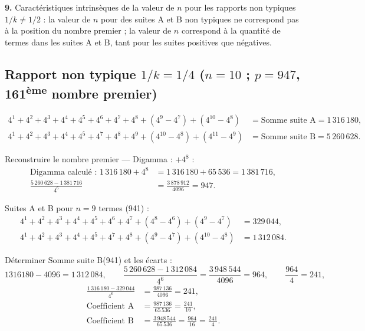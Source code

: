\documentclass[11pt,a4paper]{article}
\begin{document}
\textbf{9.} Caractéristiques intrinsèques de la valeur de $n$ pour les rapports
non typiques $1/k \neq 1/2$ : la valeur de $n$ pour des suites A et B non
typiques ne correspond pas à la position du nombre premier ; la valeur de $n$
correspond à la quantité de termes dans les suites A et B, tant pour les suites
positives que négatives.

\subsection{Rapport non typique $1/k = 1/4$ ($n = 10$ ; $p = 947$, 161\textsuperscript{ème} nombre premier)}

\begin{boiteformule}[Sommes des suites A et B --- rapport $1/4$, $n = 10$]
\begin{align*}
4^{1}+4^{2}+4^{3}+4^{4}+4^{5}+4^{6}+4^{7}+4^{8}+(4^{9}-4^{7})+(4^{10}-4^{8})
  &= \text{Somme suite A} = 1\,316\,180,\\
4^{1}+4^{2}+4^{3}+4^{4}+4^{5}+4^{7}+4^{8}+4^{9}+(4^{10}-4^{8})+(4^{11}-4^{9})
  &= \text{Somme suite B} = 5\,260\,628.
\end{align*}
\end{boiteformule}

Reconstruire le nombre premier --- Digamma : $+4^{8}$ :
\begin{align*}
\text{Digamma calculé : }1\,316\,180+4^{8}
&=1\,316\,180+65\,536=1\,381\,716,\\
\frac{5\,260\,628-1\,381\,716}{4^{6}}
&=\frac{3\,878\,912}{4096}=947.
\end{align*}

Suites A et B pour $n = 9$ termes (941) :
\begin{align*}
4^{1}+4^{2}+4^{3}+4^{4}+4^{5}+4^{6}+4^{7}+(4^{8}-4^{6})+(4^{9}-4^{7}) &= 329\,044,\\
4^{1}+4^{2}+4^{3}+4^{4}+4^{5}+4^{7}+4^{8}+(4^{9}-4^{7})+(4^{10}-4^{8}) &= 1\,312\,084.
\end{align*}

Déterminer Somme suite B(941) et les écarts :
\[
1316180 - 4096 = 1\,312\,084,
\qquad
\frac{5\,260\,628 - 1\,312\,084}{4^{6}} = \frac{3\,948\,544}{4096} = 964,
\qquad
\frac{964}{4} = 241,
\]
\begin{align*}
\frac{1\,316\,180 - 329\,044}{4^{6}}
&= \frac{987\,136}{4096} = 241,\\
\text{Coefficient A} &= \frac{987\,136}{65\,536} = \frac{241}{16},\\
\text{Coefficient B} &= \frac{3\,948\,544}{65\,536}
= \frac{964}{16} = \frac{241}{4}.
\end{align*}
\end{document}
